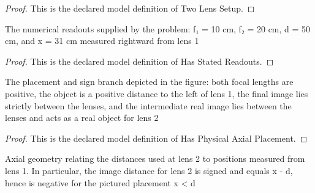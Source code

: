 \begin{proof}
  This is the declared model definition of Two Lens Setup.
\end{proof}
\begin{definition}
  \label{def:physics:phyx-mini-0031:phyxminiproblems-problemphyxmini0031-hasstatedreadouts}
  The numerical readouts supplied by the problem: f₁ = 10 cm, f₂ = 20 cm, d = 50 cm, and x = 31 cm measured rightward from lens 1
\end{definition}
\begin{proof}
  This is the declared model definition of Has Stated Readouts.
\end{proof}
\begin{definition}
  \label{def:physics:phyx-mini-0031:phyxminiproblems-problemphyxmini0031-hasphysicalaxialplacement}
  The placement and sign branch depicted in the figure: both focal lengths are positive, the object is a positive distance to the left of lens 1, the final image lies strictly between the lenses, and the intermediate real image lies between the lenses and acts as a real object for lens 2
\end{definition}
\begin{proof}
  This is the declared model definition of Has Physical Axial Placement.
\end{proof}
\begin{definition}
  \label{def:physics:phyx-mini-0031:phyxminiproblems-problemphyxmini0031-satisfiestwolensaxialgeometry}
  Axial geometry relating the distances used at lens 2 to positions measured from lens 1. In particular, the image distance for lens 2 is signed and equals x - d, hence is negative for the pictured placement x < d
\end{definition}
